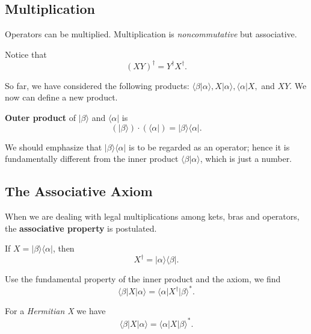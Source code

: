 \documentclass[11pt]{elegantbook}
\begin{document}
\subsection{Multiplication}

Operators can be multiplied. Multiplication is \textit{noncommutative} but associative.

Notice that 
\begin{equation}
  (XY)^\dagger=Y^\dagger X^\dagger.
\end{equation}

So far, we have considered the following products: $\langle\beta\vert\alpha\rangle,X\vert\alpha\rangle,\langle\alpha\vert X,$ and $XY$. 
We now can define a new product.

\begin{definition}
  \textbf{Outer product} of $\vert\beta\rangle$ and $\langle\alpha\vert$ is 
  \begin{equation}
    (\vert\beta\rangle)\cdot(\langle\alpha\vert)=\vert\beta\rangle\langle\alpha\vert.
  \end{equation}
\end{definition}
We should emphasize that $\vert\beta\rangle\langle\alpha\vert$ is to be regarded as an operator; 
hence it is fundamentally different from the inner product $\langle\beta\vert\alpha\rangle$, which is just a number.

\subsection{The Associative Axiom}

\begin{postulate}
  When we are dealing with legal multiplications among kets, bras and operators, the \textbf{associative property} is postulated.
\end{postulate}

\begin{corollary}
  If $X=\vert\beta\rangle\langle\alpha\vert$, then 
  \begin{equation}
    X^\dagger=\vert\alpha\rangle\langle\beta\vert.
  \end{equation}
\end{corollary}

\begin{corollary}
  Use the fundamental property of the inner product and the axiom, we find 
  \begin{equation}
    \langle\beta\vert X\vert\alpha\rangle=\langle\alpha\vert X^\dagger\vert\beta\rangle^*.
  \end{equation}

  For a \textit{Hermitian X} we have 
  \begin{equation}
    \langle\beta\vert X\vert\alpha\rangle=\langle\alpha\vert X\vert\beta\rangle^*.
  \end{equation}
\end{corollary}
\end{document}
